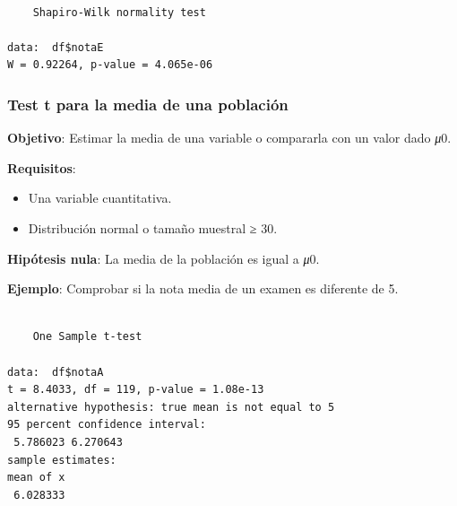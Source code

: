 \documentclass[
  a4paper,
]{scrreport}
\newenvironment{Shaded}{\begin{snugshade}}{\end{snugshade}}
\newcommand{\AttributeTok}[1]{\textcolor[rgb]{0.40,0.45,0.13}{#1}}
\newcommand{\DecValTok}[1]{\textcolor[rgb]{0.68,0.00,0.00}{#1}}
\newcommand{\FunctionTok}[1]{\textcolor[rgb]{0.28,0.35,0.67}{#1}}
\newcommand{\NormalTok}[1]{\textcolor[rgb]{0.00,0.23,0.31}{#1}}
\newcommand{\SpecialCharTok}[1]{\textcolor[rgb]{0.37,0.37,0.37}{#1}}
\newcommand{\StringTok}[1]{\textcolor[rgb]{0.13,0.47,0.30}{#1}}
\providecommand{\tightlist}{%
  \setlength{\itemsep}{0pt}\setlength{\parskip}{0pt}}\usepackage{longtable,booktabs,array}
\theoremstyle{definition}
\theoremstyle{definition}
\theoremstyle{remark}
\begin{document}
\begin{Shaded}
\end{Shaded}

\begin{verbatim}

    Shapiro-Wilk normality test

data:  df$notaE
W = 0.92264, p-value = 4.065e-06
\end{verbatim}

\hypertarget{test-t-para-la-media-de-una-poblaciuxf3n}{%
\subsubsection{Test t para la media de una
población}\label{test-t-para-la-media-de-una-poblaciuxf3n}}

\textbf{Objetivo}: Estimar la media de una variable o compararla con un
valor dado \emph{μ}0.

\textbf{Requisitos}:

\begin{itemize}
\tightlist
\item
  Una variable cuantitativa.
\item
  Distribución normal o tamaño muestral ≥ 30.
\end{itemize}

\textbf{Hipótesis nula}: La media de la población es igual a \emph{μ}0.

\textbf{Ejemplo}: Comprobar si la nota media de un examen es diferente
de 5.

\begin{Shaded}
\end{Shaded}

\begin{verbatim}

    One Sample t-test

data:  df$notaA
t = 8.4033, df = 119, p-value = 1.08e-13
alternative hypothesis: true mean is not equal to 5
95 percent confidence interval:
 5.786023 6.270643
sample estimates:
mean of x 
 6.028333 
\end{verbatim}
\end{document}

